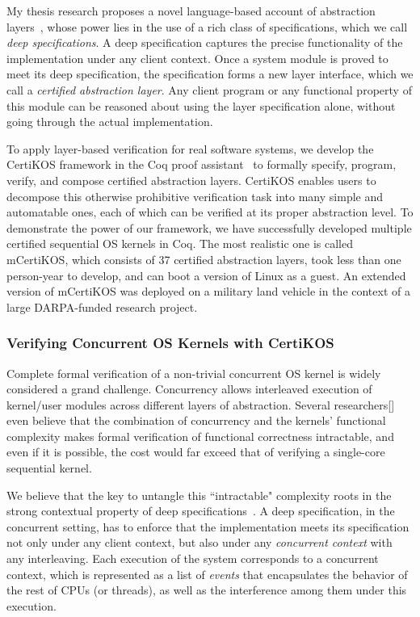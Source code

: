 \documentclass[a4paper, 10pt]{article}
\begin{document}
\begin{small}
My thesis research proposes a novel language-based account of
abstraction layers~\cite{popl15-gu}, whose power lies in the use of a rich class of specifications, which we call \emph{deep specifications}. 
A deep specification captures
the precise functionality of the implementation under any client context. 
Once a system module is proved to meet its deep specification,
the specification forms a new layer interface, which we call a \emph{certified abstraction layer}.
Any client program or any functional property of this module
can be reasoned about using the  layer specification alone, without going through the actual implementation.

To apply layer-based verification for real software systems,
we develop the CertiKOS framework in the Coq proof assistant~\cite{coq}
to formally specify, program, verify, and compose certified abstraction
layers. CertiKOS enables users to decompose this otherwise prohibitive verification task into many simple and automatable ones, each of which can be verified at its proper abstraction level. 
To demonstrate the power of our framework,
 we have successfully developed multiple certified
sequential OS kernels in Coq. 
The most realistic one is called mCertiKOS,
which consists of 37 certified abstraction layers, 
took less than one person-year to develop,
and can boot a version of Linux as a guest.
An extended version of mCertiKOS was deployed on a military land vehicle in the context of a large DARPA-funded research project.

\subsubsection*{\small Verifying Concurrent OS Kernels with CertiKOS}
Complete formal verification of a non-trivial concurrent
OS kernel is widely considered a grand challenge. 
Concurrency allows interleaved
execution of kernel/user modules across different
layers of abstraction. 
Several researchers[] even believe that the combination of concurrency and the kernels’ functional complexity makes formal verification of functional correctness intractable,
and even if it is possible, the cost would far exceed that of
verifying a single-core sequential kernel.

We believe that the key to untangle this ``intractable" complexity roots in the
strong contextual property of deep specifications~\cite{osdi16-gu}.
A deep specification, in the concurrent setting, has to enforce  that
the implementation meets its specification 
not only under any client context, but also under
any \emph{concurrent context} with any interleaving.
Each execution of the system corresponds to a  concurrent context, which is represented as a list of \emph{events} that encapsulates the behavior of the rest of CPUs (or threads), as well as the interference
among them under this execution.


\end{small}
\end{document}
